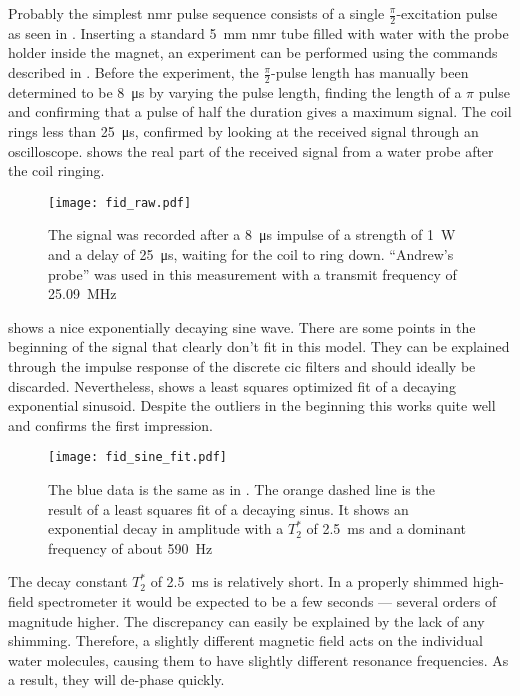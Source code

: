 Probably the simplest \acrshort{nmr} pulse sequence consists of a single \(\frac{\pi}{2}\)-excitation pulse as seen in . Inserting a standard \qty{5}{\milli\metre} \acrshort{nmr} tube filled with water with the probe holder inside the magnet, an experiment can be performed using the commands described in . Before the experiment, the \(\frac{\pi}{2}\)-pulse length has manually been determined to be \qty{8}{\micro\second} by varying the pulse length, finding the length of a \(\pi\) pulse and confirming that a pulse of half the duration gives a maximum signal. The coil rings less than \qty{25}{\micro\second}, confirmed by looking at the received signal through an oscilloscope.  shows the real part of the received signal from a water probe after the coil ringing.

\begin{figure}[h!bt]
    \centering
    \texttt{[image: fid\_raw.pdf]}
    \caption{ The signal was recorded after a \qty{8}{\micro\second} impulse of a strength of \qty{1}{\watt} and a delay of \qty{25}{\micro\second}, waiting for the coil to ring down. \enquote{Andrew's probe} was used in this measurement with a transmit frequency of \qty{25.09}{\mega\hertz}}
\end{figure}

 shows a nice exponentially decaying sine wave. There are some points in the beginning of the signal that clearly don't fit in this model. They can be explained through the impulse response of the discrete \acrshort{cic} filters and should ideally be discarded. Nevertheless,  shows a least squares optimized fit of a decaying exponential sinusoid. Despite the outliers in the beginning this works quite well and confirms the first impression.

\begin{figure}[h!bt]
    \centering
    \texttt{[image: fid\_sine\_fit.pdf]}
    \caption{ The blue data is the same as in . The orange dashed line is the result of a least squares fit of a decaying sinus. It shows an exponential decay in amplitude with a $T_2^*$ of \qty{2.5}{\milli\second} and a dominant frequency of about \qty{590}{\hertz}}
\end{figure}

The decay constant \(T_2^*\) of \qty{2.5}{\milli\second} is relatively short. In a properly shimmed high-field spectrometer it would be expected to be a few seconds --- several orders of magnitude higher. The discrepancy can easily be explained by the lack of any shimming. Therefore, a slightly different magnetic field acts on the individual water molecules, causing them to have slightly different resonance frequencies. As a result, they will de-phase quickly.

